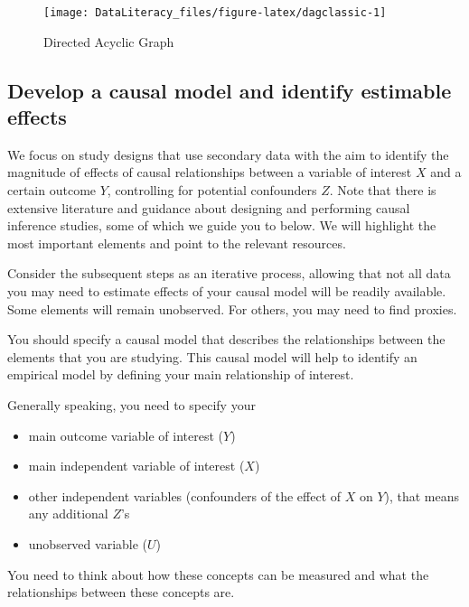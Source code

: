 \documentclass[
]{book}
\providecommand{\tightlist}{%
  \setlength{\itemsep}{0pt}\setlength{\parskip}{0pt}}
\begin{document}
\begin{figure}

{\centering \texttt{[image: DataLiteracy\_files/figure-latex/dagclassic-1]} 

}

\caption{Directed Acyclic Graph}\label{fig:dagclassic}
\end{figure}

\hypertarget{develop-a-causal-model-and-identify-estimable-effects}{%
\subsection{Develop a causal model and identify estimable
effects}\label{develop-a-causal-model-and-identify-estimable-effects}}

We focus on study designs that use secondary data with the aim to
identify the magnitude of effects of causal relationships between a
variable of interest \(X\) and a certain outcome \(Y\), controlling for
potential confounders \(Z\). Note that there is extensive literature and
guidance about designing and performing causal inference studies, some
of which we guide you to below. We will highlight the most important
elements and point to the relevant resources.

Consider the subsequent steps as an iterative process, allowing that not
all data you may need to estimate effects of your causal model will be
readily available. Some elements will remain unobserved. For others, you
may need to find proxies.

You should specify a causal model that describes the relationships
between the elements that you are studying. This causal model will help
to identify an empirical model by defining your main relationship of
interest.

Generally speaking, you need to specify your

\begin{itemize}
\tightlist
\item
  main outcome variable of interest (\(Y\))
\item
  main independent variable of interest (\(X\))
\item
  other independent variables (confounders of the effect of \(X\) on
  \(Y\)), that means any additional \(Z\)'s
\item
  unobserved variable (\(U\))
\end{itemize}

You need to think about how these concepts can be measured and what the
relationships between these concepts are.
\end{document}
